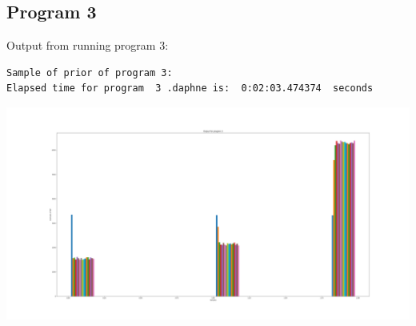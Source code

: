 \documentclass[]{article}
\begin{document}
\subsection{Program 3}
Output from running program 3:
\begin{verbatim}
Sample of prior of program 3:
Elapsed time for program  3 .daphne is:  0:02:03.474374  seconds
\end{verbatim}
\begin{center}
	\includegraphics[width=\linewidth]{Figures/P3Hist.png}
\end{center}
 
\end{document}
